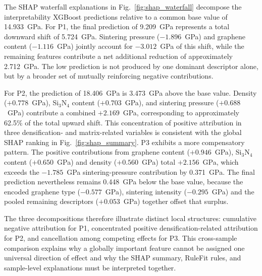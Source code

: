 \documentclass[pdflatex,sn-mathphys-num]{sn-jnl}%
\newif\ifrevmarks%
\newcommand{\revmark}[1]{\ifrevmarks\textcolor{revblue}{#1}\else#1\fi}%
\theoremstyle{thmstyleone}%
\theoremstyle{thmstyletwo}%
\theoremstyle{thmstylethree}%
\begin{document}
\revmark{The SHAP waterfall explanations in Fig.~\ref{fig:shap_waterfall} decompose the interpretability XGBoost predictions relative to a common base value of 14.933~GPa. For P1, the final prediction of 9.209~GPa represents a total downward shift of 5.724~GPa. Sintering pressure ($-1.896$~GPa) and graphene content ($-1.116$~GPa) jointly account for $-3.012$~GPa of this shift, while the remaining features contribute a net additional reduction of approximately 2.712~GPa. The low prediction is not produced by one dominant descriptor alone, but by a broader set of mutually reinforcing negative contributions.}

\revmark{For P2, the prediction of 18.406~GPa is 3.473~GPa above the base value. Density ($+0.778$~GPa), Si$_3$N$_4$ content ($+0.703$~GPa), and sintering pressure ($+0.688$~GPa) contribute a combined $+2.169$~GPa, corresponding to approximately 62.5\% of the total upward shift. This concentration of positive attribution in three densification- and matrix-related variables is consistent with the global SHAP ranking in Fig.~\ref{fig:shap_summary}. P3 exhibits a more compensatory pattern. The positive contributions from graphene content ($+0.946$~GPa), Si$_3$N$_4$ content ($+0.650$~GPa) and density ($+0.560$~GPa) total $+2.156$~GPa, which exceeds the $-1.785$~GPa sintering-pressure contribution by 0.371~GPa. The final prediction nevertheless remains 0.448~GPa below the base value, because the encoded graphene type ($-0.577$~GPa), sintering intensity ($-0.295$~GPa) and the pooled remaining descriptors ($+0.053$~GPa) together offset that surplus.}

The three decompositions therefore illustrate distinct local structures: cumulative negative attribution for P1, concentrated positive densification-related attribution for P2, and cancellation among competing effects for P3. This cross-sample comparison explains why a globally important feature cannot be assigned one universal direction of effect and why the SHAP summary, RuleFit rules, and sample-level explanations must be interpreted together.
\end{document}
